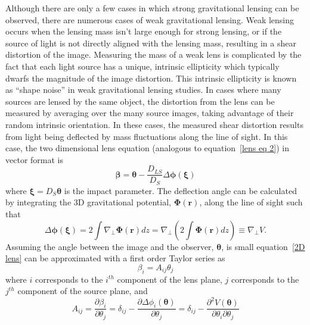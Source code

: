 Although there are only a few cases in which strong gravitational lensing can be observed, there are numerous cases of weak gravitational lensing.  Weak lensing occurs when the lensing mass isn't large enough for strong lensing, or if the source of light is not directly aligned with the lensing mass, resulting in a shear distortion of the image.  Measuring the mass of a weak lens is complicated by the fact that each light source has a unique, intrinsic ellipticity which typically dwarfs the magnitude of the image distortion.  This intrinsic ellipticity is known as ``shape noise'' in weak gravitational lensing studies.  In cases where many sources are lensed by the same object, the distortion from the lens can be measured by averaging over the many source images, taking advantage of their random intrinsic orientation.  In these cases, the measured shear distortion results from light being deflected by mass fluctuations along the line of sight.  In this case, the two dimensional lens equation (analogous to equation~\ref{lens eq 2}) in vector format is
\begin{equation} \label{2D lens}
\boldsymbol{\beta} = \boldsymbol{\theta} - \frac{D_{LS}}{D_S} \Delta \boldsymbol{\phi}(\boldsymbol{\xi})
\end{equation}
where $\boldsymbol{\xi}=D_{S}\boldsymbol{\theta}$ is the impact parameter.  The deflection angle can be calculated by integrating the 3D gravitational potential, $\boldsymbol{\Phi}(\mathbf{r})$, along the line of sight such that
\begin{equation} \label{3D angle}
\Delta \boldsymbol{\phi}(\boldsymbol{\xi}) = 2 \int \nabla_\perp \boldsymbol{\Phi}(\mathbf{r})dz = \nabla_\perp \left(2\int \boldsymbol{\Phi}(\mathbf{r}) dz \right) \equiv \nabla_\perp V.
\end{equation}
Assuming the angle between the image and the observer, $\boldsymbol{\theta}$, is small equation~\ref{2D lens} can be approximated with a first order Taylor series as
\begin{equation} \label{lens taylor}
\beta_{i}=A_{ij} \theta_{j}
\end{equation}
where $i$ corresponds to the $i^{th}$ component of the lens plane, $j$ corresponds to the $j^{th}$ component of the source plane, and 
\begin{equation} \label{dist matrix elements}
A_{ij}=\frac{ \partial \beta_i}{\partial \theta_j} = \delta_{ij} - \frac{ \partial \Delta \phi_i( \boldsymbol{\theta}) }{\partial \theta_j} = \delta_{ij} - 
\frac{ \partial ^2 V(\boldsymbol{\theta})} {\partial \theta_i \partial \theta_j}
\end{equation}
